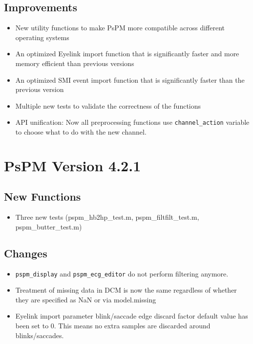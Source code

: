 \documentclass[english]{article}
\numberwithin{equation}{section}
\numberwithin{figure}{section}
\begin{document}
\subsection*{Improvements}
\begin{itemize}
\item New utility functions to make PsPM more compatible across different
operating systems
\item An optimized Eyelink import function that is significantly faster
and more memory efficient than previous versions
\item An optimized SMI event import function that is significantly faster
than the previous version
\item Multiple new tests to validate the correctness of the functions
\item API unification: Now all preprocessing functions use \texttt{channel\_action}
variable to choose what to do with the new channel.
\end{itemize}

\section{PsPM Version 4.2.1}

\subsection*{New Functions}
\begin{itemize}
\item Three new tests (pspm\_hb2hp\_test.m, pspm\_filtfilt\_test.m, pspm\_butter\_test.m)
\end{itemize}

\subsection*{Changes}
\begin{itemize}
\item \texttt{pspm\_display} and \texttt{pspm\_ecg\_editor} do not perform
filtering anymore.
\item Treatment of missing data in DCM is now the same regardless of whether
they are specified as NaN or via model.missing
\item Eyelink import parameter blink/saccade edge discard factor default
value has been set to 0. This means no extra samples are discarded
around blinks/saccades.
\end{itemize}
\end{document}
